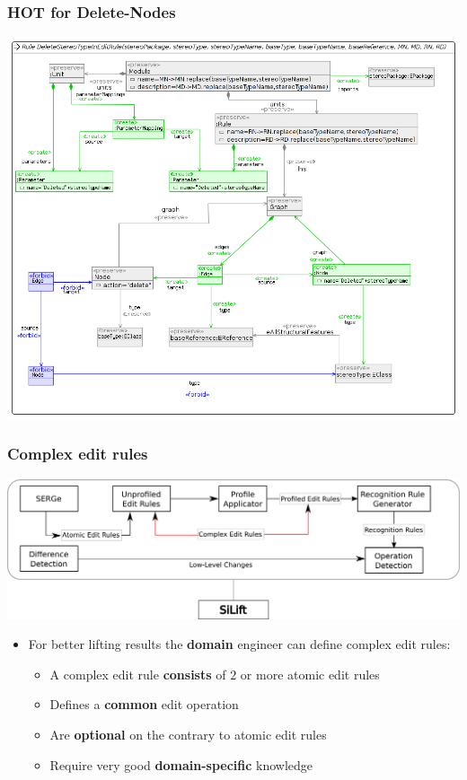 \documentclass[10pt]{beamer}
\begin{document}
\begin{frame}
\frametitle{HOT for Delete-Nodes}
\begin{center}
\includegraphics[scale=0.35]{DELETE_STEREOTYPE_IN_EDITRULE}\\
\end{center}
\end{frame}
\begin{frame}
\frametitle{Complex edit rules}
\begin{center}
\includegraphics[scale=0.4]{complexeditrules}\\
\end{center}
\begin{itemize}
  \item For better lifting results the \textbf{domain} engineer can define
  complex edit rules:
  \begin{itemize}
    \item A complex edit rule \textbf{consists} of $2$ or more atomic edit rules
    \item Defines a \textbf{common} edit operation
    \item Are \textbf{optional} on the contrary to atomic edit rules
    \item Require very good \textbf{domain-specific} knowledge 
  \end{itemize}  
\end{itemize}
\end{frame}
\end{document}
